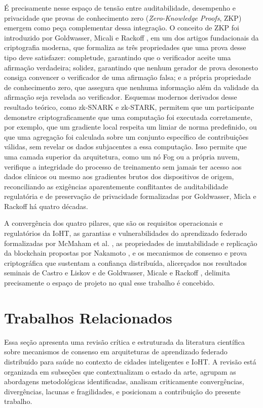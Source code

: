 \documentclass[12pt]{article}
\begin{document}
É precisamente nesse espaço de tensão entre auditabilidade, desempenho e privacidade que provas de conhecimento zero (\textit{Zero-Knowledge Proofs}, ZKP) emergem como peça complementar dessa integração. O conceito de ZKP foi introduzido por Goldwasser, Micali e Rackoff \cite{goldwasser1985knowledge}, em um dos artigos fundacionais da criptografia moderna, que formaliza as três propriedades que uma prova desse tipo deve satisfazer: completude, garantindo que o verificador aceite uma afirmação verdadeira; solidez, garantindo que nenhum gerador de prova desonesto consiga convencer o verificador de uma afirmação falsa; e a própria propriedade de conhecimento zero, que assegura que nenhuma informação além da validade da afirmação seja revelada ao verificador. Esquemas modernos derivados desse resultado teórico, como zk-SNARK e zk-STARK, permitem que um participante demonstre criptograficamente que uma computação foi executada corretamente, por exemplo, que um gradiente local respeita um limiar de norma predefinido, ou que uma agregação foi calculada sobre um conjunto específico de contribuições válidas, sem revelar os dados subjacentes a essa computação. Isso permite que uma camada superior da arquitetura, como um nó Fog ou a própria nuvem, verifique a integridade do processo de treinamento sem jamais ter acesso aos dados clínicos ou mesmo aos gradientes brutos dos dispositivos de origem, reconciliando as exigências aparentemente conflitantes de auditabilidade regulatória e de preservação de privacidade formalizadas por Goldwasser, Micla e Rackoff \cite{goldwasser1985knowledge} há quatro décadas.

A convergência dos quatro pilares, que são os requisitos operacionais e regulatórios da IoHT, as garantias e vulnerabilidades do aprendizado federado formalizadas por McMaham et al. \cite{mcmahan2017communication}, as propriedades de imutabilidade e replicação da blockchain propostas por Nakamoto \cite{nakamoto2008bitcoin}, e os mecanismos de consenso e prova criptográfica que sustentam a confiança distribuída, alicerçados nos resultados seminais de Castro e Liskov \cite{castro1999practical} e de Goldwasser, Micale e Rackoff \cite{goldwasser1985knowledge}, delimita precisamente o espaço de projeto no qual esse trabalho é concebido.


\section{Trabalhos Relacionados}

Essa seção apresenta uma revisão crítica e estruturada da literatura científica sobre mecanismos de consenso em arquiteturas de aprendizado federado distribuído para saúde no contexto de cidades inteligentes e IoHT. A revisão está organizada em subseções que contextualizam o estado da arte, agrupam as abordagens metodológicas identificadas, analisam criticamente convergências, divergências, lacunas e fragilidades, e posicionam a contribuição do presente trabalho.
\end{document}
